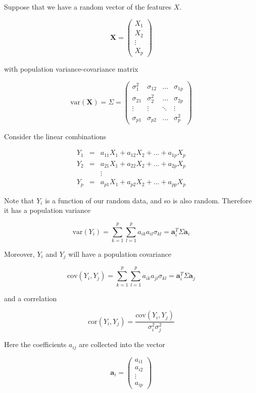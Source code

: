 \documentclass[]{book}
\theoremstyle{definition}
\theoremstyle{definition}
\theoremstyle{definition}
\theoremstyle{remark}
\begin{document}
Suppose that we have a random vector of the features \(X\).

\[ \textbf{X} = \left(\begin{array}{c} X_1\\ X_2\\ \vdots \\X_p\end{array}\right) \]

with population variance-covariance matrix

\[ \text{var}(\textbf{X}) = \Sigma = \left(\begin{array}{cccc}\sigma^2_1 & \sigma_{12} & \dots &\sigma_{1p}\\ \sigma_{21} & \sigma^2_2 & \dots &\sigma_{2p}\\  \vdots & \vdots & \ddots & \vdots \\ \sigma_{p1} & \sigma_{p2} & \dots & \sigma^2_p\end{array}\right) \]

Consider the linear combinations

\[ \begin{array}{lll} Y_1 & = & a_{11}X_1 + a_{12}X_2 + \dots + a_{1p}X_p \\ Y_2 & = & a_{21}X_1 + a_{22}X_2 + \dots + a_{2p}X_p \\ & & \vdots \\ Y_p & = & a_{p1}X_1 + a_{p2}X_2 + \dots +a_{pp}X_p \end{array} \]

Note that \(Y_i\) is a function of our random data, and so is also
random. Therefore it has a population variance

\[ \text{var}(Y_i) = \sum_{k=1}^{p} \sum_{l=1}^{p} a_{ik} a_{il} \sigma_{kl} = \mathbf{a}^T_i \Sigma \mathbf{a}_i \]

Moreover, \(Y_i\) and \(Y_j\) will have a population covariance

\[ \text{cov}(Y_i, Y_j) = \sum_{k=1}^{p} \sum_{l=1}^{p} a_{ik}a_{jl}\sigma_{kl} = \mathbf{a}^T_i\Sigma\mathbf{a}_j \]

and a correlation

\[ \text{cor}(Y_i, Y_j) = \frac{\text{cov}(Y_i, Y_j)}{\sigma^2_i \sigma^2_j}\]

Here the coefficients \(a_{ij}\) are collected into the vector

\[ \mathbf{a}_i = \left(\begin{array}{c} a_{i1}\\ a_{i2}\\ \vdots \\ a_{ip}\end{array}\right) \]
\end{document}
